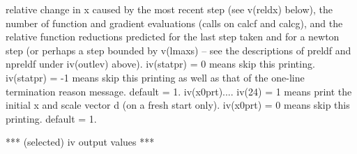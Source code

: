 \documentclass[11pt,twoside,nolof]{starlink}
\begin{document}
\begin{terminalv}
              relative change in x caused by the most recent step (see
              v(reldx) below), the number of function and gradient
              evaluations (calls on calcf and calcg), and the relative
              function reductions predicted for the last step taken and
              for a newton step (or perhaps a step bounded by v(lmaxs)
              -- see the descriptions of preldf and npreldf under
              iv(outlev) above).
              iv(statpr) = 0 means skip this printing.
              iv(statpr) = -1 means skip this printing as well as that
              of the one-line termination reason message.  default = 1.
  iv(x0prt).... iv(24) = 1 means print the initial x and scale vector d
              (on a fresh start only).  iv(x0prt) = 0 means skip this
              printing.  default = 1.

   ***  (selected) iv output values  ***


\end{terminalv}
\end{document}
